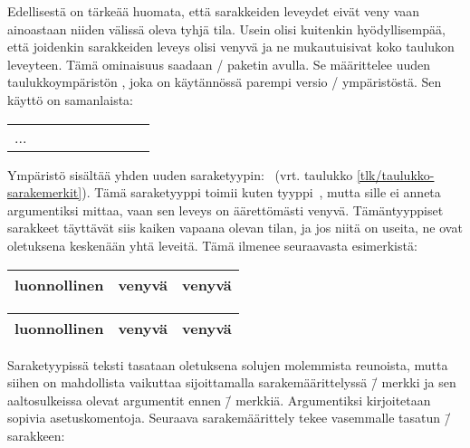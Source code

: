 \noindent
Edellisestä on tärkeää huomata, että sarakkeiden leveydet eivät veny
vaan ainoastaan niiden välissä oleva tyhjä tila. Usein olisi kuitenkin
hyödyllisempää, että joidenkin sarakkeiden leveys olisi venyvä ja ne
mukautuisivat koko taulukon leveyteen. Tämä ominaisuus saadaan
\-/ paketin avulla. Se määrittelee uuden
taulukkoympäristön , joka on käytännössä parempi
versio \-/ ympäristöstä. Sen käyttö on samanlaista:

\begin{koodilohkosis}
\begin{tabularx}{leveys}[sijainti]{sarakkeet}
  ...
\end{tabularx}
\end{koodilohkosis}

\noindent
Ympäristö  sisältää yhden uuden
saraketyypin:~ (vrt. taulukko
\ref{tlk/taulukko-sarakemerkit}). Tämä saraketyyppi toimii kuten
tyyppi~, mutta sille ei anneta argumentiksi mittaa, vaan sen
leveys on äärettömästi venyvä. Tämäntyyppiset sarakkeet täyttävät siis
kaiken vapaana olevan tilan, ja jos niitä on useita, ne ovat oletuksena
keskenään yhtä leveitä. Tämä ilmenee seuraavasta esimerkistä:

\begin{koodilohkosis}
\begin{tabularx}{\linewidth}{|l|X|X|}
  \hline luonnollinen & venyvä & venyvä \\ \hline
\end{tabularx}
\end{koodilohkosis}

\begin{tulossis}
  \renewcommand{\arraystretch}{1.2}
  \begin{tabularx}{\linewidth}{|l|X|X|}
    \hline luonnollinen & venyvä & venyvä \\ \hline
  \end{tabularx}
\end{tulossis}

\noindent
Saraketyypissä  teksti tasataan oletuksena solujen
molemmista reunoista, mutta siihen on mahdollista vaikuttaa
sijoittamalla sarakemäärittelyssä \koodi{>}\=/ merkki ja sen
aaltosulkeissa olevat argumentit ennen \=/ merkkiä.
Argumentiksi kirjoitetaan sopivia asetuskomentoja. Seuraava
sarakemäärittely tekee vasemmalle tasatun \=/ sarakkeen:

